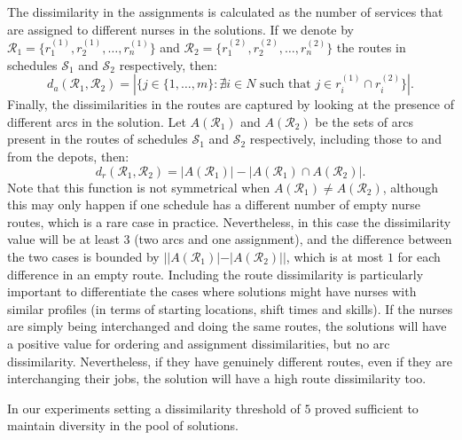 \documentclass[a4paper,11pt,authoryear]{elsarticle}
\begin{document}
The dissimilarity in the assignments is calculated as the number of services that are assigned to different nurses in the solutions. If we denote by $\mathcal{R}_1 = \{
r^{(1)}_1, r^{(1)}_2, \dots, r^{(1)}_n\}$ and $\mathcal{R}_2 = \{r^{(2)}_1, r^{(2)}_2, \dots, r^{(2)}_n\}$ the routes in schedules $\mathcal{S}_1$ and $\mathcal{S}_2$ respectively, then:
\begin{equation}
    d_a(\mathcal{R}_1, \mathcal{R}_2) = |\{j\in\{1,\dots,m\} : \nexists i \in N \text{ such that } j \in r^{(1)}_i \cap r^{(2)}_i\}|.
\end{equation}
Finally, the dissimilarities in the routes are captured by looking at the presence of different arcs in the solution. Let $A(\mathcal{R}_1)$ and $A(\mathcal{R}_2)$ be the sets of arcs present in the routes of schedules $\mathcal{S}_1$ and $\mathcal{S}_2$ respectively, including those to and from the depots, then:
\begin{equation}
    d_r(\mathcal{R}_1, \mathcal{R}_2) = |A(\mathcal{R}_1)| - |A(\mathcal{R}_1) \cap A(\mathcal{R}_2)|.
\end{equation}
Note that this function is not symmetrical when $A(\mathcal{R}_1) \neq A(\mathcal{R}_2)$, although this may only happen if one schedule has a different number of empty nurse routes, which is a rare case in practice. Nevertheless, in this case the dissimilarity value will be at least $3$ (two arcs and one assignment), and the difference between the two cases is bounded by $||A(\mathcal{R}_1)| - |A(\mathcal{R}_2)||$, which is at most $1$ for each difference in an empty route. 
Including the route dissimilarity is particularly important to differentiate the cases where solutions might have nurses with similar profiles (in terms of starting locations, shift times and skills). If the nurses are simply being interchanged and doing the same routes, the solutions will have a positive value for ordering and assignment dissimilarities, but no arc dissimilarity. Nevertheless, if they have genuinely different routes, even if they are interchanging their jobs, the solution will have a high route dissimilarity too.

In our experiments setting a dissimilarity threshold of $5$ proved sufficient to maintain diversity in the pool of solutions.

\end{document}
